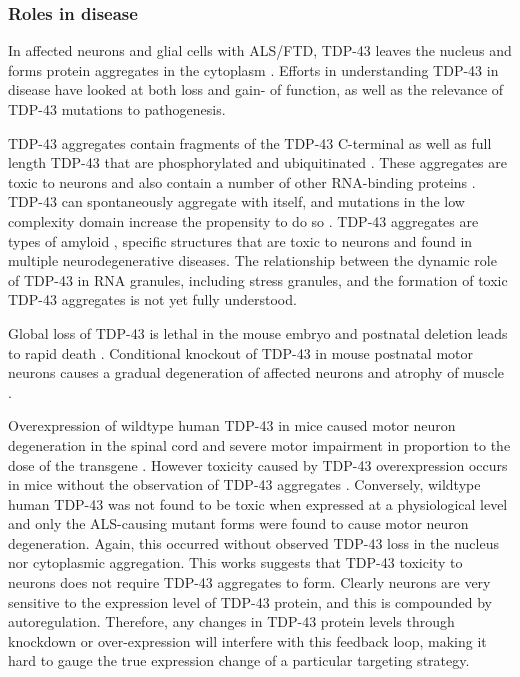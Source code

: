 
\subsubsection{Roles in disease}

In affected neurons and glial cells with ALS/FTD, TDP-43 leaves the nucleus and forms protein aggregates in the cytoplasm \citep{Neumann2006}. 
Efforts in understanding TDP-43 in disease have looked at both loss and gain- of function, as well as the relevance of TDP-43 mutations to pathogenesis.

TDP-43 aggregates contain fragments of the TDP-43 C-terminal as well as full length TDP-43 that are phosphorylated and ubiquitinated \citep{Neumann2006,Arai2006, Bosque2013, Hasegawa2008}.
These aggregates are toxic to neurons  \citep{Zhang2009} and also contain a number of other RNA-binding proteins \citep{Dammer2012}.
TDP-43 can spontaneously aggregate with itself, and mutations in the low complexity domain increase the propensity to do so \citep{Johnson2009}.
TDP-43 aggregates are types of amyloid \citep{Fang2014}, specific structures that are toxic to neurons and found in multiple neurodegenerative diseases.
The relationship between the dynamic role of TDP-43 in RNA granules, including stress granules, and the formation of toxic TDP-43 aggregates is not yet fully understood.

Global loss of TDP-43 is lethal in the mouse embryo \citep{Kraemer2010} and postnatal deletion leads to rapid death \citep{Chiang2010}. 
Conditional knockout of TDP-43 in mouse postnatal motor neurons causes a gradual degeneration of affected neurons and atrophy of muscle \citep{Iguchi2013}. 

Overexpression of wildtype human TDP-43 in mice caused motor neuron degeneration in the spinal cord and severe motor impairment in proportion to the dose of the transgene \citep{Wils2010, Shan2010}.
However toxicity caused by TDP-43 overexpression occurs in mice without the observation of TDP-43 aggregates \citep{Wegorzewska2009, Barmada2010}.
Conversely, wildtype human TDP-43 was not found to be toxic when expressed at a physiological level \citep{Arnold2013} and only the ALS-causing mutant forms were found to cause motor neuron degeneration. 
Again, this occurred without observed TDP-43 loss in the nucleus nor cytoplasmic aggregation. 
This works suggests that TDP-43 toxicity to neurons does not require TDP-43 aggregates to form.
Clearly neurons are very sensitive to the expression level of TDP-43 protein, and this is compounded by autoregulation. 
Therefore, any changes in TDP-43 protein levels through knockdown or over-expression will interfere with this feedback loop, making it hard to gauge the true expression change of a particular targeting strategy. 





